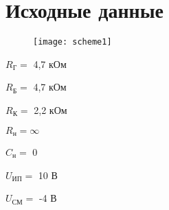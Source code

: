 \section{Исходные данные}

\begin{figure}[h!t]
  		\texttt{[image: scheme1]}
\end{figure}

\begin{multicols}{3}


$ R_{\text{Г}} = $ 4,7 кОм

$ R_{\text{Б}} = $ 4,7 кОм

$ R_{\text{К}} = $ 2,2 кОм

$ R_{\text{н}} = \infty $

$ C_{\text{н}} = $ 0 

$ U_{\text{ИП}} = $ 10 В

$ U_{\text{СМ}} = $ -4 В

\end{multicols}

